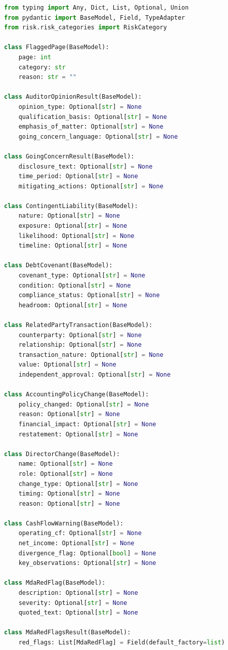 \documentclass[12pt,a4paper]{article}
\begin{document}
\begin{lstlisting}[language=Python]
from typing import Any, Dict, List, Optional, Union
from pydantic import BaseModel, Field, TypeAdapter
from risk.risk_categories import RiskCategory

class FlaggedPage(BaseModel):
    page: int
    category: str
    reason: str = ""

class AuditorOpinionResult(BaseModel):
    opinion_type: Optional[str] = None
    qualification_basis: Optional[str] = None
    emphasis_of_matter: Optional[str] = None
    going_concern_language: Optional[str] = None

class GoingConcernResult(BaseModel):
    disclosure_text: Optional[str] = None
    time_period: Optional[str] = None
    mitigating_actions: Optional[str] = None

class ContingentLiability(BaseModel):
    nature: Optional[str] = None
    exposure: Optional[str] = None
    likelihood: Optional[str] = None
    timeline: Optional[str] = None

class DebtCovenant(BaseModel):
    covenant_type: Optional[str] = None
    condition: Optional[str] = None
    compliance_status: Optional[str] = None
    headroom: Optional[str] = None

class RelatedPartyTransaction(BaseModel):
    counterparty: Optional[str] = None
    relationship: Optional[str] = None
    transaction_nature: Optional[str] = None
    value: Optional[str] = None
    independent_approval: Optional[str] = None

class AccountingPolicyChange(BaseModel):
    policy_changed: Optional[str] = None
    reason: Optional[str] = None
    financial_impact: Optional[str] = None
    restatement: Optional[str] = None

class DirectorChange(BaseModel):
    name: Optional[str] = None
    role: Optional[str] = None
    change_type: Optional[str] = None
    timing: Optional[str] = None
    reason: Optional[str] = None

class CashFlowWarning(BaseModel):
    operating_cf: Optional[str] = None
    net_income: Optional[str] = None
    divergence_flag: Optional[bool] = None
    key_observations: Optional[str] = None

class MdaRedFlag(BaseModel):
    description: Optional[str] = None
    severity: Optional[str] = None
    quoted_text: Optional[str] = None

class MdaRedFlagsResult(BaseModel):
    red_flags: List[MdaRedFlag] = Field(default_factory=list)


\end{lstlisting}
\end{document}
